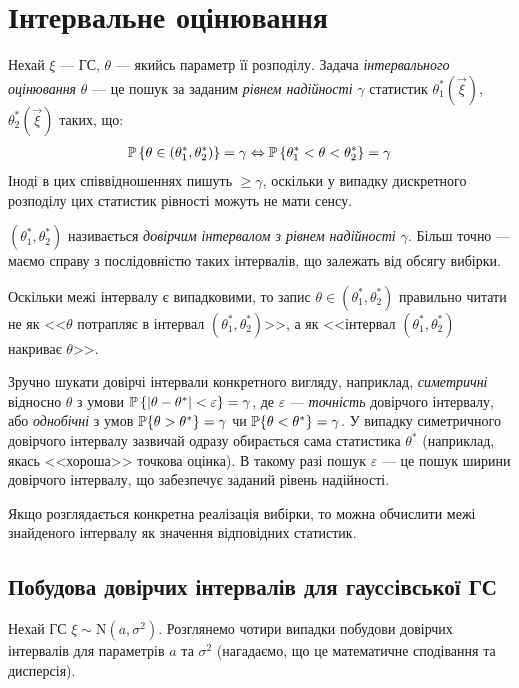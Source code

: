 \section{Інтервальне оцінювання}
Нехай $\xi$ --- ГС, $\theta$ --- якийсь параметр її
розподілу.
Задача \emph{інтервального оцінювання} $\theta$ --- це пошук за заданим \emph{рівнем надійності} 
$\gamma$ статистик
$\theta^*_1(\vec{\xi})$, $\theta^*_2(\vec{\xi})$ таких, що:
\begin{gather*}
    \P\left\{\theta \in (\theta^*_1, \theta^*_2)\right\} = \gamma \Leftrightarrow
    \P\left\{ \theta^*_1 < \theta < \theta^*_2\right\} = \gamma
\end{gather*}
Іноді в цих співвідношеннях пишуть $\geq \gamma$, оскільки у випадку дискретного розподілу цих статистик рівності можуть не мати сенсу.

\begin{definition}
    $(\theta^*_1, \theta^*_2)$ називається \emph{довірчим інтервалом з рівнем надійності $\gamma$}.
    Більш точно --- маємо справу з послідовністю таких інтервалів, що залежать від обсягу вибірки.
\end{definition}
\begin{remark}
    Оскільки межі інтервалу є випадковими, то запис $\theta \in (\theta^*_1, \theta^*_2)$ правильно читати не як
    <<$\theta$ потрапляє в інтервал $(\theta^*_1, \theta^*_2)$>>, а як
    <<інтервал $(\theta^*_1, \theta^*_2)$ накриває $\theta$>>.
\end{remark}
Зручно шукати довірчі інтервали конкретного вигляду, наприклад,
\emph{симетричні} відносно $\theta$ з умови $\P\left\{|\theta - \theta^*| < \varepsilon\right\} = \gamma$, де $\varepsilon$ --- \emph{точність} 
довірчого інтервалу, або \emph{однобічні} з умов $\P\{\theta > \theta^*\} = \gamma$ чи $\P\{\theta < \theta^*\} = \gamma$.
У випадку симетричного довірчого інтервалу зазвичай одразу обирається сама статистика $\theta^*$ (наприклад, якась <<хороша>> точкова оцінка).
В такому разі пошук $\varepsilon$ --- це пошук ширини довірчого інтервалу, що забезпечує заданий рівень надійності.

Якщо розглядається конкретна реалізація вибірки, то можна обчислити межі знайденого інтервалу як значення відповідних статистик.

\subsection{Побудова довірчих інтервалів для гаусcівської ГС}
Нехай ГС $\xi \sim \mathrm{N}(a, \sigma^2)$. Розглянемо чотири випадки побудови довірчих інтервалів
для параметрів $a$ та $\sigma^2$ (нагадаємо, що це математичне сподівання та дисперсія).

